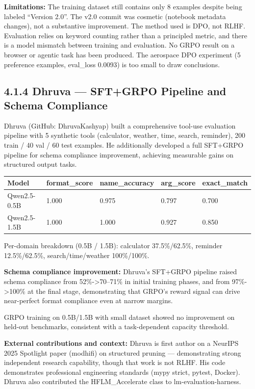 \documentclass[
  american,
  11pt,
  a4paper,
  oneside]{report}
\newcounter{none} %
\begin{document}
\textbf{Limitations:} The training dataset still contains only 8
examples despite being labeled ``Version 2.0''. The v2.0 commit was
cosmetic (notebook metadata changes), not a substantive improvement. The
method used is DPO, not RLHF. Evaluation relies on keyword counting
rather than a principled metric, and there is a model mismatch between
training and evaluation. No GRPO result on a browser or agentic task has
been produced. The aerospace DPO experiment (5 preference examples,
eval\_loss 0.0093) is too small to draw conclusions.

\subsection{4.1.4 Dhruva --- SFT+GRPO Pipeline and Schema
Compliance}\label{dhruva-sftgrpo-pipeline-and-schema-compliance}

Dhruva (GitHub: DhruvaKashyap) built a comprehensive tool-use evaluation
pipeline with 5 synthetic tools (calculator, weather, time, search,
reminder), 200 train / 40 val / 60 test examples. He additionally
developed a full SFT+GRPO pipeline for schema compliance improvement,
achieving measurable gains on structured output tasks.

{\def\LTcaptype{none} %
\begin{longtable}[]{@{}lllll@{}}
\toprule\noalign{}
Model & format\_score & name\_accuracy & arg\_score & exact\_match \\
\midrule\noalign{}
\endhead
\bottomrule\noalign{}
\endlastfoot
Qwen2.5-0.5B & 1.000 & 0.975 & 0.797 & 0.700 \\
Qwen2.5-1.5B & 1.000 & 1.000 & 0.927 & 0.850 \\
\end{longtable}
}

Per-domain breakdown (0.5B / 1.5B): calculator 37.5\%/62.5\%, reminder
12.5\%/62.5\%, search/time/weather 100\%/100\%.

\textbf{Schema compliance improvement:} Dhruva's SFT+GRPO pipeline
raised schema compliance from 52\%-\textgreater70--71\% in initial
training phases, and from 97\%-\textgreater100\% at the final stage,
demonstrating that GRPO's reward signal can drive near-perfect format
compliance even at narrow margins.

GRPO training on 0.5B/1.5B with small dataset showed no improvement on
held-out benchmarks, consistent with a task-dependent capacity
threshold.

\textbf{External contributions and context:} Dhruva is first author on a
NeurIPS 2025 Spotlight paper (modhifi) on structured pruning ---
demonstrating strong independent research capability, though that work
is not RLHF. His code demonstrates professional engineering standards
(mypy strict, pytest, Docker). Dhruva also contributed the
HFLM\_Accelerate class to lm-evaluation-harness.
\end{document}
